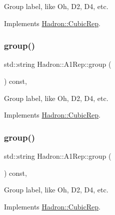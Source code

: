 Group label, like Oh, D2, D4, etc. 

Implements \mbox{\hyperlink{structHadron_1_1CubicRep_a0748f11ec87f387062c8e8981339a29c}{Hadron\+::\+Cubic\+Rep}}.

\mbox{\label{structHadron_1_1A1Rep_a12c63341924c5a2e4c0444911503c3f8}} 
\subsubsection{\texorpdfstring{group()}{group()}\hspace{0.1cm}{\footnotesize\ttfamily [2/3]}}
{\footnotesize\ttfamily std\+::string Hadron\+::\+A1\+Rep\+::group (\begin{DoxyParamCaption}{ }\end{DoxyParamCaption}) const\hspace{0.3cm}{\ttfamily [inline]}, {\ttfamily [virtual]}}

Group label, like Oh, D2, D4, etc. 

Implements \mbox{\hyperlink{structHadron_1_1CubicRep_a0748f11ec87f387062c8e8981339a29c}{Hadron\+::\+Cubic\+Rep}}.

\mbox{\label{structHadron_1_1A1Rep_a12c63341924c5a2e4c0444911503c3f8}} 
\subsubsection{\texorpdfstring{group()}{group()}\hspace{0.1cm}{\footnotesize\ttfamily [3/3]}}
{\footnotesize\ttfamily std\+::string Hadron\+::\+A1\+Rep\+::group (\begin{DoxyParamCaption}{ }\end{DoxyParamCaption}) const\hspace{0.3cm}{\ttfamily [inline]}, {\ttfamily [virtual]}}

Group label, like Oh, D2, D4, etc. 

Implements \mbox{\hyperlink{structHadron_1_1CubicRep_a0748f11ec87f387062c8e8981339a29c}{Hadron\+::\+Cubic\+Rep}}.

\mbox{\label{structHadron_1_1A1Rep_a6b592d902063cfea9bd1cedcdeb9ac79}} 
